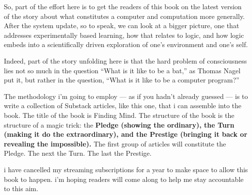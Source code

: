 So, part of the effort here is to get the readers of this book on the latest version of the story about what constitutes a computer and computation more generally. After the system update, so to speak, we can look at a bigger picture, one that addresses experimentally based learning, how that relates to logic, and how logic embeds into a scientifically driven exploration of one's environment and one's self.

Indeed, part of the story unfolding here is that the hard problem of consciousness lies not so much in the question ``What is it like to be a bat,'' as Thomas Nagel put it, but rather in the question, ``What is it like to be a computer program?'' 

The methodology i'm going to employ --- as if you hadn't already guessed --- is to write a collection of Substack articles, like this one, that i can assemble into the book. The title of the book is Finding Mind. The structure of the book is the structure of a magic trick: the \textbf{Pledge (showing the ordinary), the Turn (making it do the extraordinary), and the Prestige (bringing it back or revealing the impossible). }The first group of articles will constitute the Pledge. The next the Turn. The last the Prestige.

i have cancelled my streaming subscriptions for a year to make space to allow this book to happen. i'm hoping readers will come along to help me stay accountable to this aim.
